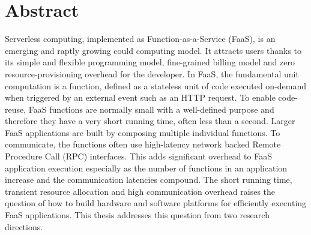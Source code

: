 \documentclass[../main.tex]{subfiles}
\begin{document}
\chapter{Abstract}


Serverless computing, implemented as Function-as-a-Service (FaaS), is
an emerging and raptly growing could computing model. It attracts
users thanks to its simple and flexible programming model,
fine-grained billing model and zero resource-provisioning overhead for
the developer. In FaaS, the fundamental unit
computation is a function, defined as a stateless unit of code
executed on-demand when triggered by an external event such as an HTTP
request. To enable code-reuse, FaaS functions are normally small
with a well-defined purpose and therefore they have a very short
running time, often less than a second. Larger FaaS applications
are built by composing multiple individual functions. To communicate,
the functions often use high-latency network backed Remote Procedure
Call (RPC) interfaces. This adds significant overhead to FaaS
application execution especially as the number of functions in an
application increase and the communication latencies compound. The
short running time, transient resource allocation and high
communication overhead raises the question of how to build hardware
and software platforms for efficiently executing FaaS
applications. This thesis addresses this question from two research
directions.
\end{document}

